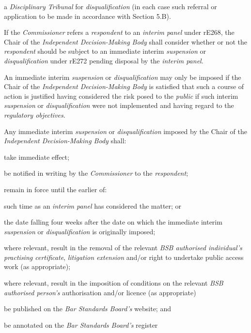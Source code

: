 a \emph{Disciplinary Tribunal} for \emph{disqualification} (in each case
such referral or application to be made in accordance with Section
5.B).\\
\par
If the \emph{Commissioner} refers a \emph{respondent} to
an \emph{interim panel} under\textbf{ }rE268, the Chair of
the\emph{ Independent Decision-Making Body} shall consider whether or
not the \emph{respondent} should be subject to an immediate
interim \emph{suspension} or \emph{disqualification} under rE272 pending
disposal by the \emph{interim panel}.\\
\par
An immediate interim \emph{suspension} or \emph{disqualification} may
only be imposed if the Chair of the \emph{Independent Decision-Making
Body} is satisfied that such a course of action is justified having
considered the risk posed to the \emph{public} if such
interim \emph{suspension} or \emph{disqualification} were not
implemented and having regard to the \emph{regulatory objectives}.\\
\par
Any immediate
interim \emph{suspension} or \emph{disqualification} imposed by the
Chair of the \emph{Independent Decision-Making Body} shall:\\\nl \item take immediate effect;\item be notified in writing by the \emph{Commissioner} to
the \emph{respondent};\item remain in force until the earlier of:\al
\item  such time as an \emph{interim panel} has considered the matter; or\\
\item  the date falling four weeks after the date on which the immediate
interim \emph{suspension} or \emph{disqualification} is originally
imposed;\la\item where relevant, result in the removal of the relevant \emph{BSB
authorised individual's} \emph{practising certificate}, \emph{litigation
extension} and/or right to undertake public access work (as
appropriate);\item where relevant, result in the imposition of conditions on the
relevant \emph{BSB authorised person's} authorisation\textbf{ }and/or
licence (as appropriate)\item be published on the \emph{Bar Standards Board's} website; and\item be annotated on the \emph{Bar Standards Board's} register
